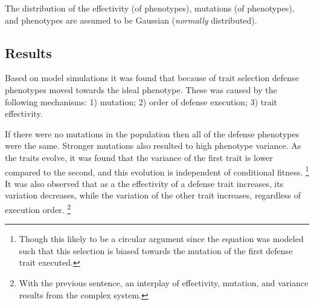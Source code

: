 The distribution of the effectivity (of phenotypes), mutations (of phenotypes), and phenotypes are assumed to be Gaussian (\emph{normally} distributed).

\subsection{Results}
Based on model simulations it was found that because of trait selection defense phenotypes moved towards the ideal phenotype.
These was caused by the following mechanisms:
1) mutation;
2) order of defense execution;
3) trait effectivity.

If there were no mutations in the population then all of the defense phenotypes were the same.
Stronger mutations also resulted to high phenotype variance.
As the traits evolve, it was found that the variance of the first trait is lower compared to the second, and this evolution is independent of conditional fitness.
\footnote{Though this likely to be a circular argument since the equation was modeled such that this selection is biased towards the mutation of the first defense trait executed.}
It was also observed that as a the effectivity of a defense trait increases, its variation decreases, while the variation of the other trait increases, regardless of execution order.
\footnote{With the previous sentence, an interplay of effectivity, mutation, and variance results from the complex system.}
